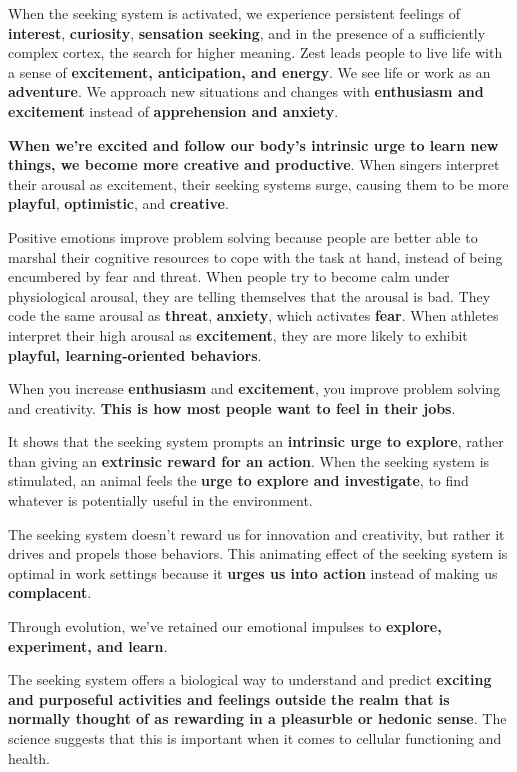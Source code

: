 \documentclass[ebook,12pt,oneside,openany]{memoir}
\begin{document}
When the seeking system is activated, we experience persistent feelings of \textbf{interest}, \textbf{curiosity}, \textbf{sensation seeking}, and in the presence of a sufficiently complex cortex, the search for higher meaning.
Zest leads people to live life with a sense of \textbf{excitement, anticipation, and energy}.
We see life or work as an \textbf{adventure}. We approach new situations and changes with \textbf{enthusiasm and excitement} instead of \textbf{apprehension and anxiety}.

\textbf{When we're excited and follow our body's intrinsic urge to learn new things, we become more creative and productive}.
When singers interpret their arousal as excitement, their seeking systems surge, causing them to be more \textbf{playful}, \textbf{optimistic}, and \textbf{creative}.

Positive emotions improve problem solving because people are better able to marshal their cognitive resources to cope with the task at hand, instead of being encumbered by fear and threat.
When people try to become calm under physiological arousal, they are telling themselves that the arousal is bad.
They code the same arousal as \textbf{threat}, \textbf{anxiety}, which activates \textbf{fear}.
When athletes interpret their high arousal as \textbf{excitement}, they are more likely to exhibit \textbf{playful, learning-oriented behaviors}.

When you increase \textbf{enthusiasm} and \textbf{excitement}, you improve problem solving and creativity.
\textbf{This is how most people want to feel in their jobs}.

It shows that the seeking system prompts an \textbf{intrinsic urge to explore}, rather than giving an \textbf{extrinsic reward for an action}.
When the seeking system is stimulated, an animal feels the \textbf{urge to explore and investigate}, to find whatever is potentially useful in the environment.

The seeking system doesn't reward us for innovation and creativity, but rather it drives and propels those behaviors.
This animating effect of the seeking system is optimal in work settings because it \textbf{urges us into action} instead of making us \textbf{complacent}.

Through evolution, we've retained our emotional impulses to \textbf{explore, experiment, and learn}.

The seeking system offers a biological way to understand and predict \textbf{exciting and purposeful activities and feelings outside the realm that is normally thought of as rewarding in a pleasurble or hedonic sense}.
The science suggests that this is important when it comes to cellular functioning and health.
\end{document}

